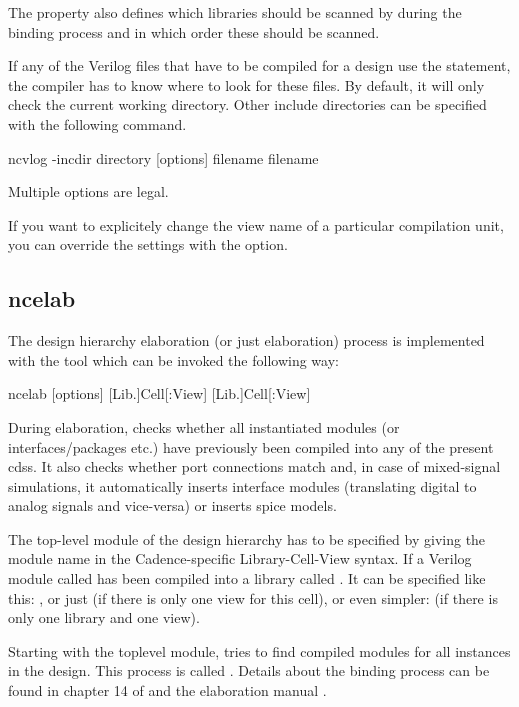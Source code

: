 The  property also defines which libraries should be scanned by
 during the binding process and in which order these should be
scanned.

If any of the Verilog files that have to be compiled for a design use the
 statement, the compiler has to know where to look for these
files. By default, it will only check the current working directory. Other
include directories can be specified with the following command.
\begin{lstbashplain}
 ncvlog -incdir directory [options] filename { filename }
\end{lstbashplain}
Multiple  options are legal.

If you want to explicitely change the view name of a particular compilation
unit, you can override the  settings with the  option.

\subsection{ncelab}
\label{sec:ncelab}
The design hierarchy elaboration (or just elaboration) process is implemented
with the tool  which can be invoked the following way:
\begin{lstbashplain}
 ncelab [options] [Lib.]Cell[:View] { [Lib.]Cell[:View] }
\end{lstbashplain}

During elaboration,  checks whether all instantiated modules (or
interfaces/packages etc.) have previously been compiled into any of the present
\glspl{cds}. It also checks whether port connections match and, in case of
mixed-signal simulations, it automatically inserts interface modules
(translating digital to analog signals and vice-versa) or inserts spice models. 

The top-level module of the design hierarchy has to be specified by giving the
module name in the Cadence-specific Library-Cell-View syntax. If a Verilog
module called  has been compiled into a library called .
It can be specified like this: , or just
 (if there is only one view for this cell), or even simpler:
 (if there is only one library and one view).

Starting with the toplevel module,  tries to find compiled modules
for all instances in the design. This process is called . Details
about the binding process can be found in chapter 14 of \citep{cds2014amssimug}
and the elaboration manual \citep{cds2014ncelab}.

